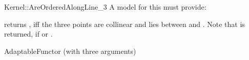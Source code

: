 \begin{ccRefFunctionObjectConcept}{Kernel::AreOrderedAlongLine_3}
A model for this must provide:


         {returns , iff the three points are collinear and 
           lies between  and .
          Note that  is returned, if  or
          .}

\ccRefines
AdaptableFunctor (with three arguments)

\ccSeeAlso
{}  \\


\end{ccRefFunctionObjectConcept}
